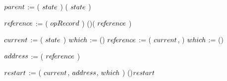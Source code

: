 \begin{limitscope}
\begin{algorithm}[tbh]
{{	    \BlankLine
			
			{
			   \label{lin:local-seek|successor:while:clean:begin}
			   \If{\NeedCleanParentNode( $\opRecord$, $\cNode$ )}
		     {
				    
				    $\pNode$ := \GetSecondToTop( $state$ )\;
				    \If{\LNot(\IsClean( $\pNode$ ))}
				    {
				       \RemoveFromTop( $state$ )\;
					     \Continue\;
							 \label{lin:local-seek|successor:while:clean:end}
				    }
			   }
				
			}
			
			
	    $re\!f\!erence$ := \NeedSuccessorKey( $\opRecord$ )\;
			\label{lin:local-seek|successor:while:need|successor}
			\If(){\IsNull( $re\!f\!erence$ )}{ 
			   \Return \false\;
			}
					
			$\cNode$ := \GetTop( $state$ )\;
			{
			   \label{lin:local-seek|successor:while:traversal:if:begin}
			   $which$ := \RIGHT\;
				 \label{lin:local-seek|successor:while:traversal:if:end}
			}
			\Else()
			{
			   \label{lin:local-seek|successor:while:traversal:else:begin}
		 	   $re\!f\!erence$ := \GetChild( $\cNode$, \LEFT{} )\;
			   $which$ := \LEFT\;
				 \label{lin:local-seek|successor:while:traversal:else:end}
			}
			\Repeat(){\True}
	    {
			   \label{lin:local-seek|successor:while:traversal:begin}
				
				 $address$ := \GetAddress( $re\!f\!erence$ )\;	
				
				 $restart$ := \Move( $\cNode$, $address$, $which$ )\;
				 \label{lin:local-seek|successor:while:traversal:move}
			   \If(){$restart$}
			   {
				    \Break\;
						\label{lin:local-seek|successor:while:traversal:restart}
			   }  
				 
}}}
\end{algorithm}
\end{limitscope}

